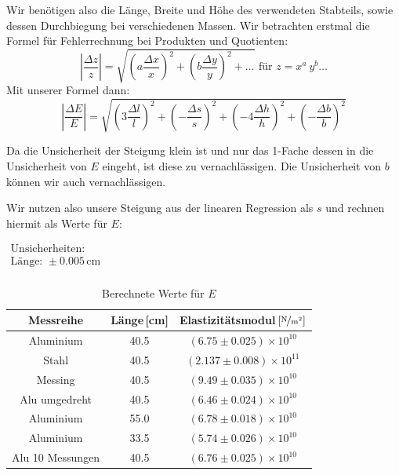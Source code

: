 \documentclass[11pt,a4paper]{article}
\newcommand\prodquo{\begin{equation}\left\vert\frac{\Delta z}{z}\right\vert=\sqrt{\left(a\frac{\Delta x}{x}\right)^2+\left(b\frac{\Delta y}{y}\right)^2+\ldots}\textrm{ f\"ur }z=x^a\ y^b\ldots\end{equation}}
\begin{document}
Wir ben\"otigen also die L\"ange, Breite und H\"ohe des verwendeten Stabteils, sowie dessen Durchbiegung bei verschiedenen Massen. Wir betrachten erstmal die Formel f\"ur Fehlerrechnung bei Produkten und Quotienten:
\prodquo
Mit unserer Formel dann:
\begin{equation}
\left\vert\frac{\Delta E}{E}\right\vert=\sqrt{\left(3\frac{\Delta l}{l}\right)^2+\left(-\frac{\Delta s}{s}\right)^2+\left(-4\frac{\Delta h}{h}\right)^2+\left(-\frac{\Delta b}{b}\right)^2}
\end{equation}

Da die Unsicherheit der Steigung klein ist und nur das 1-Fache dessen in die Unsicherheit von $E$ eingeht, ist diese zu vernachl\"assigen. Die Unsicherheit von $b$ k\"onnen wir auch vernachl\"assigen.


Wir nutzen also unsere Steigung aus der linearen Regression als $s$ und rechnen hiermit als Werte f\"ur $E$:

\begin{table}[h]
\centering
\caption{Berechnete Werte f\"ur $E$} \vspace{11pt}
$\begin{array}{l}
\textrm{Unsicherheiten:}\\
\textrm{L\"ange: } \pm 0.005\,\textrm{cm}\\
\end{array}$
\begin{tabular}{ccc}
\toprule
\textrm{Messreihe} & \textrm{L\"ange}\,[\textrm{cm}] & \textrm{Elastizit\"atsmodul}\,$\left[\nicefrac{\mathrm{N}}{\mathrm{m^2}}\right]$ \\
\midrule 
\textrm{Aluminium} & 40.5 & $(6.75\pm0.025)\times10^{10}$ \\
\textrm{Stahl} & 40.5 & $(2.137\pm0.008)\times10^{11}$ \\
\textrm{Messing} & 40.5 & $(9.49\pm0.035)\times10^{10}$ \\
\hline
\textrm{Alu umgedreht} & 40.5 & $(6.46\pm0.024)\times10^{10}$ \\
\textrm{Aluminium} & 55.0 & $(6.78\pm0.018)\times10^{10}$ \\ 
\textrm{Aluminium} & 33.5 & $(5.74\pm0.026)\times10^{10}$ \\ 
\textrm{Alu 10 Messungen} & 40.5 & $(6.76\pm0.025)\times10^{10}$ \\ 
\bottomrule
\end{tabular}
\label{Tab:1}
\end{table}
\end{document}
